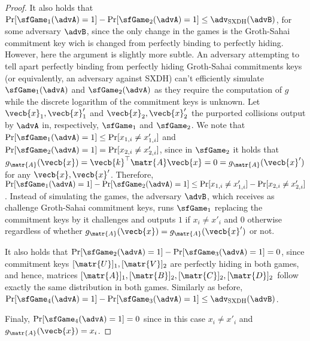 \begin{proof}
It also holds that $\Pr[\sfGame_1(\advA)=1]-\Pr[\sfGame_2(\advA)=1]\leq\adv_\mathrm{SXDH}(\advB)$, for some adversary $\advB$, since the only change in the games is the Groth-Sahai commitment key wich is changed from perfectly binding to perfectly hiding. However, here the argument is slightly more subtle. An adversary attempting to tell apart perfectly binding from perfectly hiding Groth-Sahai commitments keys (or equivalently, an adversary against SXDH) can't efficiently simulate $\sfGame_1(\advA)$ and $\sfGame_2(\advA)$ as they require the computation of $g$ while the discrete logarithm of the commitment keys is unknown. Let $\vecb{x}_1,\vecb{x}'_1$ and $\vecb{x}_2,\vecb{x}'_2$ the purported collisions output by $\advA$ in, respectively, $\sfGame_1$ and $\sfGame_2$. We note that $\Pr[\sfGame_1(\advA)=1] \leq \Pr[x_{1,i}\neq x'_{1,i}]$ and $\Pr[\sfGame_2(\advA)=1] = \Pr[x_{2,i}\neq x'_{2,i}]$, since in $\sfGame_2$ it holds that $g_{\matr{A}}(\vecb{x}) = \vecb{k}^\top\matr{A}\vecb{x} = 0 = g_\matr{A}(\vecb{x}')$ for any $\vecb{x},\vecb{x}'$. Therefore, $\Pr[\sfGame_1(\advA)=1]-\Pr[\sfGame_2(\advA)=1]\leq \Pr[x_{1,i}\neq x'_{1,i}]-\Pr[x_{2,i}\neq x'_{2,i}]$. Instead of simulating the games, the adversary $\advB$, which receives as challenge Groth-Sahai commitment keys, runs $\sfGame_1$ replacing the commitment keys by it challenges and outputs $1$ if $x_i\neq x'_i$ and $0$ otherwise regardless of whether $g_\matr{A}(\vecb{x})=g_{\matr{A}}(\vecb{x}')$ or not.

It also holds that $\Pr[\sfGame_2(\advA)=1]-\Pr[\sfGame_3(\advA)=1]=0$, since commitment keys $[\matr{U}]_1,[\matr{V}]_2$ are perfectly hiding in both games, and hence, matrices $[\matr{A}]_1,[\matr{B}]_2,[\matr{C}]_2,[\matr{D}]_2$ follow exactly the same distribution in both games.
Similarly as before, $\Pr[\sfGame_4(\advA)=1]-\Pr[\sfGame_3(\advA)=1]\leq\adv_\mathrm{SXDH}(\advB)$.

Finaly, $\Pr[\sfGame_4(\advA)=1]=0$ since in this case $x_i \neq x'_i$ and $g_\matr{A}(\vecb{x}) = x_i$.
\end{proof}